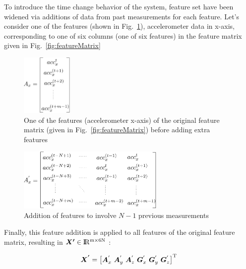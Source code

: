 To introduce the time change behavior of the system, feature set have been widened via additions of data from past measurements for each feature. 
Let's consider one of the features (shown in Fig.~\ref{fig:featureVectorNormal}), accelerometer data in x-axis, corresponding to one of six columns (one of six features) in the feature matrix given in Fig.~\ref{fig:featureMatrix}

\begin{figure}[H]
\begin{center}
\includegraphics[width=0.22\textwidth]{figures/featureVectorNormal}    %
\caption{One of the features (accelerometer x-axis) of the original feature matrix (given in Fig.~\ref{fig:featureMatrix}) before adding extra features} 
\label{fig:featureVectorNormal}
\end{center}
\end{figure}

\begin{figure}[H]
\begin{center}
\includegraphics[width=0.63\textwidth]{figures/addingFeatures}    %
\caption{Addition of features to involve $N-1$ previous measurements} 
\label{fig:addingFeatures}
\end{center}
\end{figure}

Finally, this feature addition is applied to all features of the original feature matrix, resulting in $\bm{X'} \in {\rm I\!R^{m \times 6N}}$ :

\begin{equation}
\bm{X^{'}}= \begin{bmatrix} \bm{A}_x^{'}\ \bm{A}_y^{'} \ \bm{A}_z^{'} \ \bm{G}_x^{'} \ \bm{G}_y^{'} \ \bm{G}_z^{'}  \end{bmatrix}^{\rm T}
\end{equation}


